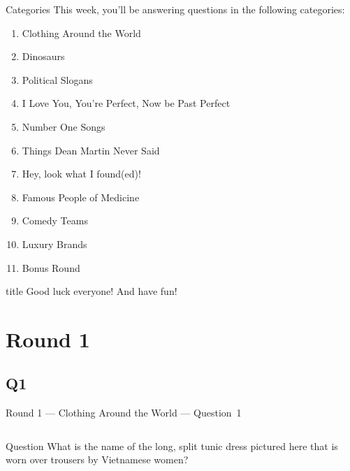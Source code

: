 \documentclass[11pt]{beamer}
\begin{document}
\begingroup{}
\begingroup{}
\begin{frame}[t]{Categories}
This week, you'll be answering questions in the following categories:
\begin{enumerate}
\item Clothing Around the World
\item Dinosaurs
\item Political Slogans
\item I Love You, You're Perfect, Now be Past Perfect
\item Number One Songs
\item Things Dean Martin Never Said
\item Hey, look what I found(ed)!
\item Famous People of Medicine
\item Comedy Teams
\item Luxury Brands
\item Bonus Round
\end{enumerate}
\end{frame}
\endgroup{}

\begingroup{}
\begin{frame}
\vfill{}
\begin{beamercolorbox}[sep=8pt,center,shadow=true,rounded=true]{title}
Good luck everyone! And have fun!
\end{beamercolorbox}
\vfill{}
\end{frame}
\endgroup{}
\def\thisSectionName{Clothing Around the World}
\section{Round 1}
\subsection*{Q1}
\begin{frame}[t]{Round 1 --- Clothing Around the World --- \mbox{Question 1}}
\vspace{-0.5em}
\begin{columns}[T,totalwidth=\linewidth]
\begin{column}{0.37\linewidth}
\begin{block}{Question}
What is the name of the  long, split tunic dress pictured here that is worn over trousers by Vietnamese women?
\end{block}
\end{column}
\begin{column}{0.62\linewidth}
\begin{center}
\texttt{[image: \{Images/aodai]}.jpg}
\end{center}
\end{column}
\end{columns}
\end{frame}
\end{document}
